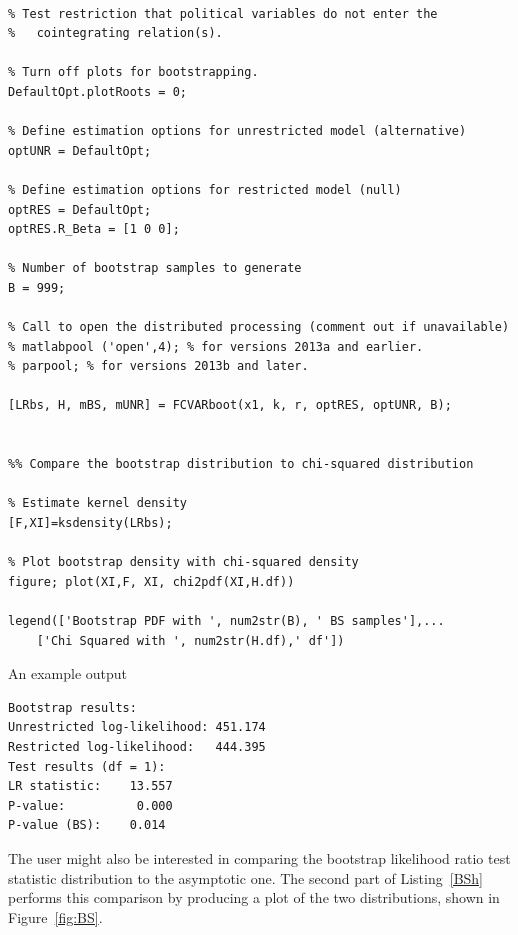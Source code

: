 \documentclass[10pt]{article}
\begin{document}
\begin{lstlisting}[frame=single,caption={Bootstrap hypothesis test}, label = BSh]
%% --------- BOOTSTRAP HYPOTHESIS TEST ---------- %

% Test restriction that political variables do not enter the  
%   cointegrating relation(s).

% Turn off plots for bootstrapping.
DefaultOpt.plotRoots = 0;

% Define estimation options for unrestricted model (alternative)
optUNR = DefaultOpt;

% Define estimation options for restricted model (null)
optRES = DefaultOpt;
optRES.R_Beta = [1 0 0];

% Number of bootstrap samples to generate
B = 999;

% Call to open the distributed processing (comment out if unavailable)
% matlabpool ('open',4); % for versions 2013a and earlier.
% parpool; % for versions 2013b and later.

[LRbs, H, mBS, mUNR] = FCVARboot(x1, k, r, optRES, optUNR, B);


%% Compare the bootstrap distribution to chi-squared distribution

% Estimate kernel density
[F,XI]=ksdensity(LRbs);

% Plot bootstrap density with chi-squared density
figure; plot(XI,F, XI, chi2pdf(XI,H.df))

legend(['Bootstrap PDF with ', num2str(B), ' BS samples'],...
    ['Chi Squared with ', num2str(H.df),' df'])
\end{lstlisting}

An example output 
\begin{verbatim}
Bootstrap results:
Unrestricted log-likelihood: 451.174
Restricted log-likelihood:   444.395
Test results (df = 1):
LR statistic: 	 13.557
P-value: 	      0.000
P-value (BS): 	 0.014
\end{verbatim}

The user might also be interested in comparing the bootstrap likelihood ratio test statistic distribution to the asymptotic one. The second part of Listing~\ref{BSh} performs this comparison by producing a plot of the two distributions, shown in Figure~\ref{fig:BS}.
\end{document}
